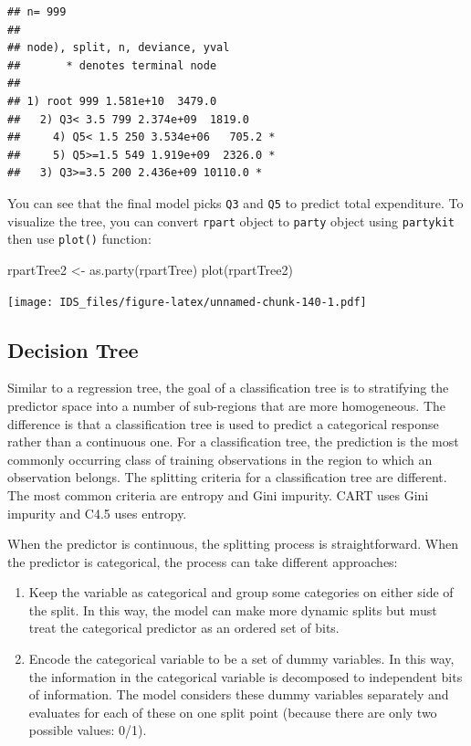 \documentclass[
  12pt,
]{krantz}
\makeatletter
\newenvironment{Shaded}{\begin{snugshade}}{\end{snugshade}}
\newcommand{\FunctionTok}[1]{\textcolor[rgb]{0,0,0}{#1}}
\newcommand{\NormalTok}[1]{#1}
\newcommand{\OtherTok}[1]{\textcolor[rgb]{0.37,0.37,0.37}{#1}}
\providecommand{\tightlist}{%
  \setlength{\itemsep}{0pt}\setlength{\parskip}{0pt}}
\newenvironment{kframe}{%
\medskip{}
\setlength{\fboxsep}{.8em}
 \def\at@end@of@kframe{}%
 \ifinner\ifhmode%
  \def\at@end@of@kframe{\end{minipage}}%
  \begin{minipage}{\columnwidth}%
 \fi\fi%
 \def\FrameCommand##1{\hskip\@totalleftmargin \hskip-\fboxsep
 \colorbox{shadecolor}{##1}\hskip-\fboxsep
     \hskip-\linewidth \hskip-\@totalleftmargin \hskip\columnwidth}%
 \MakeFramed {\advance\hsize-\width
   \@totalleftmargin\z@ \linewidth\hsize
   \@setminipage}}%
 {\par\unskip\endMakeFramed%
 \at@end@of@kframe}
\renewenvironment{Shaded}{\begin{kframe}}{\end{kframe}}
\makeatother
\begin{document}
\begin{verbatim}
## n= 999 
## 
## node), split, n, deviance, yval
##       * denotes terminal node
## 
## 1) root 999 1.581e+10  3479.0  
##   2) Q3< 3.5 799 2.374e+09  1819.0  
##     4) Q5< 1.5 250 3.534e+06   705.2 *
##     5) Q5>=1.5 549 1.919e+09  2326.0 *
##   3) Q3>=3.5 200 2.436e+09 10110.0 *
\end{verbatim}

You can see that the final model picks \texttt{Q3} and \texttt{Q5} to predict total expenditure. To visualize the tree, you can convert \texttt{rpart} object to \texttt{party} object using \texttt{partykit} then use \texttt{plot()} function:

\begin{Shaded}
\begin{Highlighting}[]
\NormalTok{rpartTree2 }\OtherTok{\textless{}{-}} \FunctionTok{as.party}\NormalTok{(rpartTree)}
\FunctionTok{plot}\NormalTok{(rpartTree2)}
\end{Highlighting}
\end{Shaded}

\texttt{[image: IDS\_files/figure-latex/unnamed-chunk-140-1.pdf]}

\hypertarget{decision-tree}{%
\subsection{Decision Tree}\label{decision-tree}}

Similar to a regression tree, the goal of a classification tree is to stratifying the predictor space into a number of sub-regions that are more homogeneous. The difference is that a classification tree is used to predict a categorical response rather than a continuous one. For a classification tree, the prediction is the most commonly occurring class of training observations in the region to which an observation belongs. The splitting criteria for a classification tree are different. The most common criteria are entropy and Gini impurity. CART uses Gini impurity and C4.5 uses entropy.

When the predictor is continuous, the splitting process is straightforward. When the predictor is categorical, the process can take different approaches:

\begin{enumerate}
\def\labelenumi{\arabic{enumi}.}
\tightlist
\item
  Keep the variable as categorical and group some categories on either side of the split. In this way, the model can make more dynamic splits but must treat the categorical predictor as an ordered set of bits.
\item
  Encode the categorical variable to be a set of dummy variables. In this way, the information in the categorical variable is decomposed to independent bits of information. The model considers these dummy variables separately and evaluates for each of these on one split point (because there are only two possible values: 0/1).
\end{enumerate}
\end{document}
